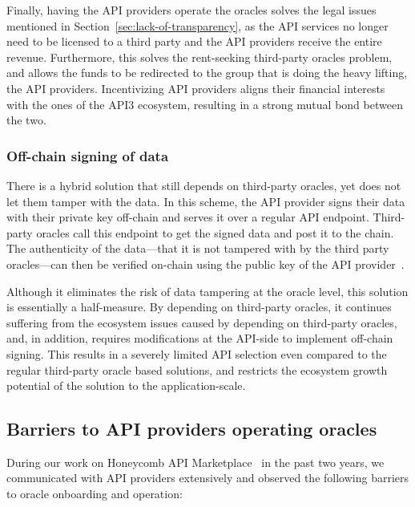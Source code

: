 \documentclass[11pt]{article}
\begin{document}
Finally, having the API providers operate the oracles solves the legal issues mentioned in Section~\ref{sec:lack-of-transparency}, as the API services no longer need to be licensed to a third party and the API providers receive the entire revenue.
Furthermore, this solves the rent-seeking third-party oracles problem, and allows the funds to be redirected to the group that is doing the heavy lifting, the API providers.
Incentivizing API providers aligns their financial interests with the ones of the API3 ecosystem, resulting in a strong mutual bond between the two.

\subsubsection{Off-chain signing of data}
\label{sec:off-chain-signing-of-data}

There is a hybrid solution that still depends on third-party oracles, yet does not let them tamper with the data.
In this scheme, the API provider signs their data with their private key off-chain and serves it over a regular API endpoint.
Third-party oracles call this endpoint to get the signed data and post it to the chain.
The authenticity of the data---that it is not tampered with by the third party oracles---can then be verified on-chain using the public key of the API provider~\cite{open-price-feed}.

Although it eliminates the risk of data tampering at the oracle level, this solution is essentially a half-measure.
By depending on third-party oracles, it continues suffering from the ecosystem issues caused by depending on third-party oracles, and, in addition, requires modifications at the API-side to implement off-chain signing.
This results in a severely limited API selection even compared to the regular third-party oracle based solutions, and restricts the ecosystem growth potential of the solution to the application-scale.

\subsection{Barriers to API providers operating oracles}
\label{sec:barriers-to-api-providers-operating-oracles}

During our work on Honeycomb API Marketplace~\cite{benligiray:2019} in the past two years, we communicated with API providers extensively and observed the following barriers to oracle onboarding and operation:
\end{document}
